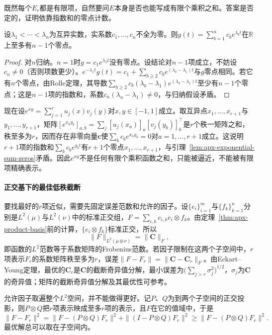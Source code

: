 既然每个$E_r$都是有限项，自然要问$E$本身是否也能写成有限个乘积之和。答案是否定的，证明依靠指数和的零点计数。

\begin{lemma}[指数和的零点]
\label{lem:apx-exponential-sum-zeros}
设$\lambda_1<\cdots<\lambda_n$为互异实数，实系数$c_1,\ldots,c_n$不全为零。则$g(t)=\sum_{b=1}^nc_be^{\lambda_bt}$在$\mathbb R$上至多有$n-1$个零点。
\end{lemma}

\begin{proof}
对$n$归纳。$n=1$时$g=c_1e^{\lambda_1t}$没有零点。设结论对$n-1$项成立，不妨设$c_n\ne0$（否则项数更少）。$e^{-\lambda_1t}g(t)=c_1+\sum_{b\ge2}c_be^{(\lambda_b-\lambda_1)t}$与$g$零点相同。若它有$n$个零点，由Rolle定理，其导数$\sum_{b\ge2}c_b(\lambda_b-\lambda_1)e^{(\lambda_b-\lambda_1)t}$至少有$n-1$个零点；这是$n-1$项的指数和，系数$c_n(\lambda_n-\lambda_1)\ne0$，与归纳假设矛盾。
\end{proof}

现在设$e^{xy}=\sum_{j=1}^ru_j(x)v_j(y)$对$x,y\in[-1,1]$成立。取互异点$x_1,\ldots,x_{r+1}$与$y_1,\ldots,y_{r+1}$，矩阵$[e^{x_ay_b}]_{a,b}=\sum_j[u_j(x_a)]_a[v_j(y_b)]_b^{\top}$是$r$个秩一矩阵之和，秩至多为$r$，因而存在非零向量$\bm c$使$\sum_bc_be^{x_ay_b}=0$对$a=1,\ldots,r+1$成立。这说明$r+1$项的指数和$\sum_bc_be^{y_bt}$有$r+1$个零点$x_1,\ldots,x_{r+1}$，与引理~\ref{lem:apx-exponential-sum-zeros}矛盾。因此$e^{xy}$不是任何有限个乘积函数之和，只能被逼近，不能被有限项精确表示。

\paragraph{正交基下的最佳低秩截断}

要找最好的$r$项近似，需要先固定误差范数和允许的因子。设$\{e_i\}_{i=1}^m$与$\{f_k\}_{k=1}^n$分别是$L^2(\mu)$与$L^2(\nu)$中的标准正交组，$F=\sum_{i,k}c_{i,k}e_i\otimes f_k$。由定理~\ref{thm:apx-product-basis}前的计算，$\{e_i\otimes f_k\}$标准正交，所以
\[
  \|F\|_{L^2(\mu\otimes\nu)}=\|\bm C\|_F,
\]
即函数的$L^2$范数等于系数矩阵的Frobenius范数。若因子限制在这两个子空间中，$r$项表示$F_r$的系数矩阵秩至多为$r$，误差$\|F-F_r\|=\|\bm C-\bm C_r\|_F$。由Eckart--Young定理\cite{eckart1936}，最优的$\bm C_r$是$\bm C$的截断奇异值分解，最小误差为$\bigl(\sum_{j>r}\sigma_j^2\bigr)^{1/2}$，$\sigma_j$为$\bm C$的奇异值；矩阵的截断奇异值分解及其最优性可参考。

允许因子取遍整个$L^2$空间，并不能做得更好。记$P$、$Q$为到两个子空间的正交投影，则$P\otimes Q$把$r$项表示映成至多$r$项的表示，且$F$在它的值域中，于是
\[
  \|F-F_r\|^2=\|F-(P\otimes Q)F_r\|^2+\|(I-P\otimes Q)F_r\|^2\ge\|F-(P\otimes Q)F_r\|^2 .
\]
最优解总可以取在子空间内。

